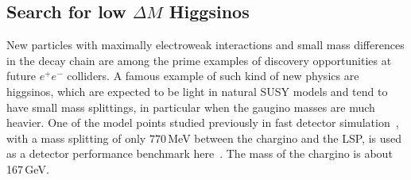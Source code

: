\subsection{Search for low \texorpdfstring{$\Delta M$}{DeltaM} Higgsinos}
\label{subsec:bench:higgsino}

New particles with maximally electroweak interactions and small mass differences in the decay chain are among the prime examples of discovery opportunities at future $e^+e^-$ colliders. A famous example of such kind of
new physics are higgsinos, which are expected to be light in natural SUSY models and tend to have small mass
splittings, in particular when the gaugino masses are much heavier. One of the model points studied previously in fast detector simulation~\cite{Berggren:2013vfa}, with a mass splitting of only $770$\,MeV between the chargino and the LSP, is used as a detector performance benchmark here~\cite{ILDNote:higgsinos}. The mass of the
chargino is about 167\,GeV.

